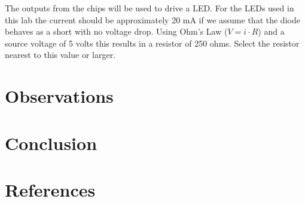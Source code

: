 \documentclass[12pt]{article}
\begin{document}
The outputs from the chips will be used to drive a LED.
For the LEDs used in this lab the current should be approximately
20 mA if we assume that the diode behaves as a short with no voltage drop.
Using Ohm's Law ($V = i \cdot R$) and a source voltage of 5 volts
this results in a resistor of 250 ohms.
Select the resistor nearest to this value or larger.


\section{Observations}


\section{Conclusion}


\renewcommand*{\refname}{\vspace{-8mm}}
\section{References}
%
%



\end{document}
